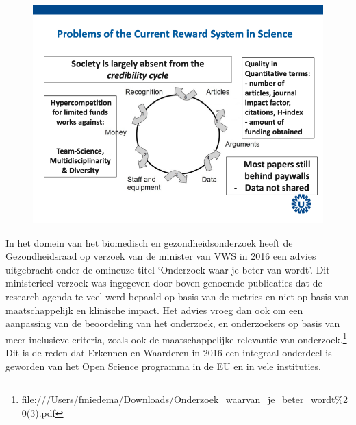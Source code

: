 \documentclass[empirical, authordate, ]{new-jote-article}
\begin{document}
	\begin{figure}
		\includegraphics[width=\linewidth]{media/image3.png}

		\caption{}

		\label{fig:rId18}


	\end{figure}



	In het domein van het biomedisch en gezondheidsonderzoek heeft de Gezondheidsraad op verzoek van de minister van VWS in 2016 een advies uitgebracht onder de omineuze titel ‘Onderzoek waar je beter van wordt'. Dit ministerieel verzoek was ingegeven door boven genoemde publicaties dat de research agenda te veel werd bepaald op basis van de metrics en niet op basis van maatschappelijk en klinische impact. Het advies vroeg dan ook om een aanpassing van de beoordeling van het onderzoek, en onderzoekers op basis van meer inclusieve criteria, zoals ook de maatschappelijke relevantie van onderzoek.\footnote{file:///Users/fmiedema/Downloads/Onderzoek\_waarvan\_je\_beter\_wordt\%20(3).pdf} Dit is de reden dat Erkennen en Waarderen in 2016 een integraal onderdeel is geworden van het Open Science programma in de EU en in vele instituties.
\end{document}
